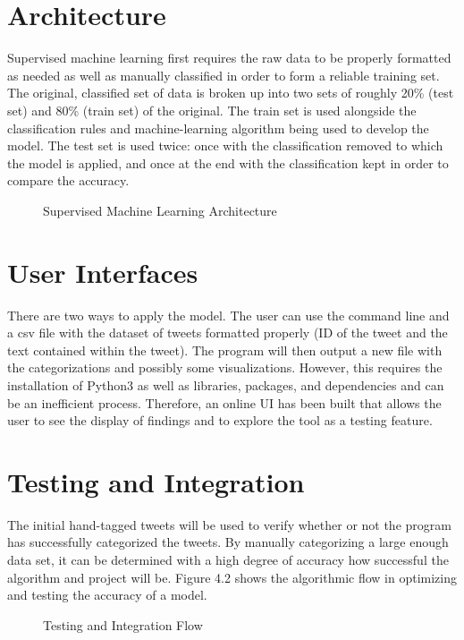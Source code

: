 \section{Architecture}

Supervised machine learning first requires the raw data to be properly formatted as needed as well as manually classified in order to form a reliable training set. The original, classified set of data is broken up into two sets of roughly 20\% (test set) and 80\% (train set) of the original. The train set is used alongside the classification rules and machine-learning algorithm being used to develop the model. The test set is used twice: once with the classification removed to which the model is applied, and once at the end with the classification kept in order to compare the accuracy.
\hfill \break

\begin{figure}[H]

\caption{Supervised Machine Learning Architecture}
\end{figure}


\section{User Interfaces}

There are two ways to apply the model. The user can use the command line and a csv file with the dataset of tweets formatted properly (ID of the tweet and the text contained within the tweet). The program will then output a new file with the categorizations and possibly some visualizations. However, this requires the installation of Python3 as well as libraries, packages, and dependencies and can be an inefficient process. Therefore, an online UI has been built that allows the user to see the display of findings and to explore the tool as a testing feature.

\section{Testing and Integration}

The initial hand-tagged tweets will be used to verify whether or not the program has successfully categorized the tweets. By manually categorizing a large enough data set, it can be determined with a high degree of accuracy how successful the algorithm and project will be. Figure 4.2 shows the algorithmic flow in optimizing and testing the accuracy of a model.

\begin{figure}[H]
    
    \caption{Testing and Integration Flow}
\end{figure}

